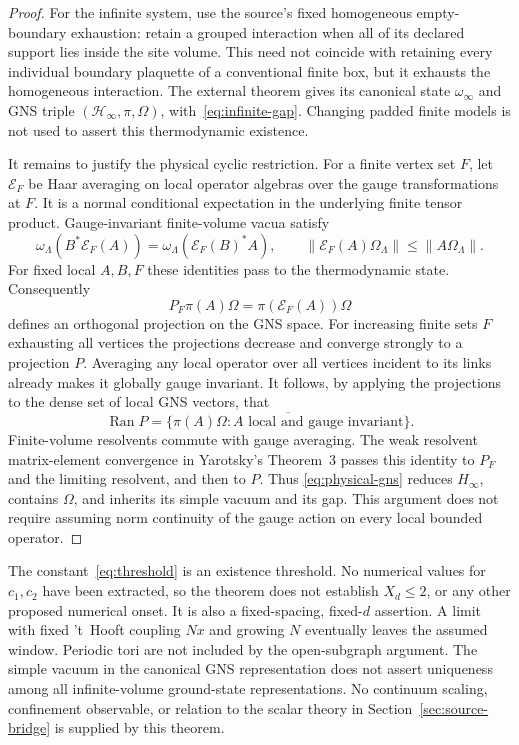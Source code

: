 \documentclass[11pt,letterpaper]{article}
\theoremstyle{definition}
\numberwithin{equation}{section}
\begin{document}
\begin{proof}
For the infinite system, use the source's fixed homogeneous
empty-boundary exhaustion: retain a grouped interaction when all of its
declared support lies inside the site volume. This need not coincide with
retaining every individual boundary plaquette of a conventional finite
box, but it exhausts the homogeneous interaction. The external theorem
gives its canonical state $\omega_\infty$ and GNS triple
$(\mathcal H_\infty,\pi,\Omega)$, with~\eqref{eq:infinite-gap}.
Changing padded finite models is not used to assert this thermodynamic
existence.

It remains to justify the physical cyclic restriction. For a finite
vertex set $F$, let $\mathcal E_F$ be Haar averaging on local operator
algebras over the gauge transformations at $F$. It is a normal conditional
expectation in the underlying finite tensor product. Gauge-invariant
finite-volume vacua satisfy
\[
 \omega_\Lambda(B^*\mathcal E_F(A))
 =\omega_\Lambda(\mathcal E_F(B)^*A),\qquad
 \|\mathcal E_F(A)\Omega_\Lambda\|\le\|A\Omega_\Lambda\|.
\]
For fixed local $A,B,F$ these identities pass to the thermodynamic state.
Consequently
\[
 P_F\pi(A)\Omega=\pi(\mathcal E_F(A))\Omega
\]
defines an orthogonal projection on the GNS space. For increasing finite
sets $F$ exhausting all vertices the projections decrease and converge
strongly to a projection $P$. Averaging any local operator over all
vertices incident to its links already makes it globally gauge invariant.
It follows, by applying the projections to the dense set of local GNS
vectors, that
\begin{equation}
 \operatorname{Ran}P=
 \overline{\{\pi(A)\Omega:A\text{ local and gauge invariant}\}}.
 \label{eq:physical-gns}
\end{equation}
Finite-volume resolvents commute with gauge averaging. The weak resolvent
matrix-element convergence in Yarotsky's Theorem~3 passes this identity
to $P_F$ and the limiting resolvent, and then to $P$. Thus
\eqref{eq:physical-gns} reduces $H_\infty$, contains $\Omega$, and
inherits its simple vacuum and its gap. This argument does not require
assuming norm continuity of the gauge action on every local bounded
operator.
\end{proof}

The constant~\eqref{eq:threshold} is an existence threshold. No numerical
values for $c_1,c_2$ have been extracted, so the theorem does not establish
$X_d\le2$, or any other proposed numerical onset. It is also a
fixed-spacing, fixed-$d$ assertion. A limit with fixed 't~Hooft coupling
$Nx$ and growing $N$ eventually leaves the assumed window. Periodic tori
are not included by the open-subgraph argument. The simple vacuum in the
canonical GNS representation does not assert uniqueness among all
infinite-volume ground-state representations. No continuum scaling,
confinement observable, or relation to the scalar theory in
Section~\ref{sec:source-bridge} is supplied by this theorem.
\end{document}
